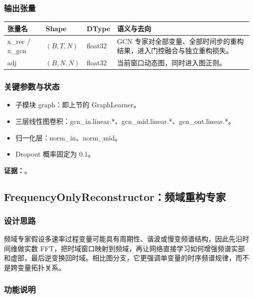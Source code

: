 \documentclass[11pt,a4paper]{ctexart}
\newcommand{\code}[1]{{\ttfamily\small #1}}
\newcommand{\evidence}[1]{\textbf{证据：}#1}
\begin{document}
\subsubsection{输出张量}

\begin{tabularx}{\textwidth}{@{}L{3.6cm}L{2.3cm}L{1.5cm}Y@{}}
\toprule
张量名 & Shape & DType & 语义与去向 \\
\midrule
\code{x\_rec} / \code{x\_gcn} & $(B,T,N)$ & \code{float32} & GCN 专家对全部变量、全部时间步的重构结果，进入门控融合与独立重构损失。 \\
\code{adj} & $(B,N,N)$ & \code{float32} & 当前窗口动态图，同时进入图正则。 \\
\bottomrule
\end{tabularx}

\subsubsection{关键参数与状态}

\begin{itemize}
  \item 子模块 \code{graph}：即上节的 \code{GraphLearner}。
  \item 三层线性图卷积：\code{gcn\_in.linear.*}、\code{gcn\_mid.linear.*}、\code{gcn\_out.linear.*}。
  \item 归一化层：\code{norm\_in}、\code{norm\_mid}。
  \item Dropout 概率固定为 0.1。
\end{itemize}

\evidence{。}

\subsection{FrequencyOnlyReconstructor：频域重构专家}

\subsubsection{设计思路}

频域专家假设多速率过程变量可能具有周期性、谐波或慢变频谱结构，因此先沿时间维做实数 FFT，把时域窗口映射到频域，再让网络直接学习如何增强频谱实部和虚部，最后逆变换回时域。相比图分支，它更强调单变量的时序频谱规律，而不是跨变量拓扑关系。

\subsubsection{功能说明}
\end{document}
